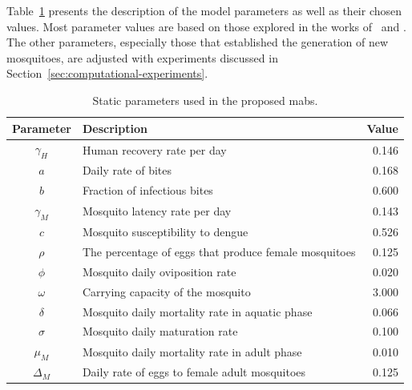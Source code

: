Table~\ref{tab:parameters-mabs} presents the description of the model parameters
as well as their chosen values. Most parameter values are based on those
explored in the works of~\cite{da-silva:2020} and \cite{dwivedi:2022}. The other
parameters, especially those that established the generation of new mosquitoes,
are adjusted with experiments discussed in
Section~\ref{sec:computational-experiments}.

\begin{table}[!ht]
	\centering
	\caption{\label{tab:parameters-mabs} Static parameters used in the proposed
		\gls{mabs}.} \small{%
		\begin{tabular}{clr}
			\toprule
			\textbf{Parameter} & \textbf{Description}                                  & \textbf{Value} \\ \midrule
			$\gamma_H$         & Human recovery rate per day                           & 0.146          \\ \hline
			$a$                & Daily rate of bites                                   & 0.168          \\ \hline
			$b$                & Fraction of infectious bites                          & 0.600          \\ \hline
			$\gamma_M$         & Mosquito latency rate per day                         & 0.143          \\ \hline
			$c$                & Mosquito susceptibility to dengue                     & 0.526          \\ \hline
			$\rho$             & The percentage of eggs that produce female mosquitoes & 0.125
			\\ \hline
			$\phi$             & Mosquito daily oviposition rate                       & 0.020          \\ \hline
			$\omega$           & Carrying capacity of the mosquito                     & 3.000          \\
			\hline
			$\delta$           & Mosquito daily mortality rate in aquatic phase        & 0.066          \\ \hline
			$\sigma$           & Mosquito daily maturation rate                        & 0.100          \\ \hline
			$\mu_M$            & Mosquito daily mortality rate in adult phase          & 0.010
			\\ \hline
			$\Delta_M$         & Daily rate of eggs to female adult mosquitoes         &
			0.125                                                                                       \\
			\bottomrule
		\end{tabular}%
	}
\end{table}

